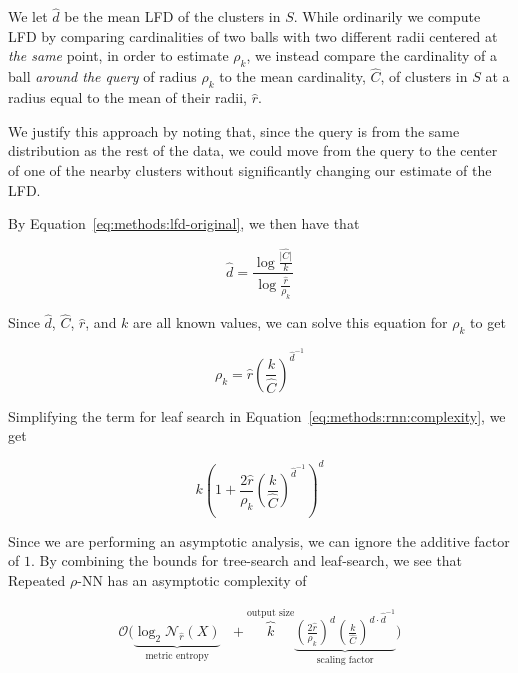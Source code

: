 We let $\hat{d}$ be the mean LFD of the clusters in $S$.
While ordinarily we compute LFD by comparing cardinalities of two balls with two different radii centered at \emph{the same} point, in order to estimate $\rho_k$, we instead compare the cardinality of a ball \emph{around the query} of radius $\rho_k$ to the mean cardinality, $\hat{C}$, of clusters in $S$ at a radius equal to the mean of their radii, $\hat{r}$.

We justify this approach by noting that, since the query is from the same distribution as the rest of the data, we could move from the query to the center of one of the nearby clusters without significantly changing our estimate of the LFD.

By Equation~\ref{eq:methods:lfd-original}, we then have that

\begin{equation*}
    \hat{d} = \frac{\log{}\frac{\hat{|C|}}{k}}{\log{}\frac{\hat{r}}{\rho_k}}
\end{equation*}

Since $\hat{d}$, $\hat{C}$, $\hat{r}$, and $k$ are all known values, we can solve this equation for $\rho_k$ to get

\begin{equation*}
    \rho_k = \hat{r} \left( \frac{k}{\hat{C}} \right)^{\hat{d}^{-1}}
\end{equation*}

Simplifying the term for leaf search in Equation~\ref{eq:methods:rnn:complexity}, we get

\begin{equation*}
    k \left( 1+ \frac{2\hat{r}}{\rho_k} \left( \frac{k}{\hat{C}} \right) ^ {\hat{d}^{-1}} \right)^d
\end{equation*}

Since we are performing an asymptotic analysis, we can ignore the additive factor of $1$.
By combining the bounds for tree-search and leaf-search, we see that Repeated $\rho$-NN has an asymptotic complexity of

\begin{gather}
    \mathcal{O}
    \Bigg(
        \underbrace{\log_2{\mathcal{N}_{\hat{r}}(X)}}_{\textrm{metric entropy}} \ \ \ + 
        \overbrace{k}^{\textrm{output size}}
        \underbrace{
            \left( \frac{2\hat{r}}{\rho_k} \right) ^ d \left( \frac{k}{\hat{C}} \right) ^ {d \cdot \hat{d}^{-1}}
        }_{\textrm{scaling factor}}
    \Bigg)
    \label{eq:methods:knn-by-rnn-complexity}
\end{gather}

